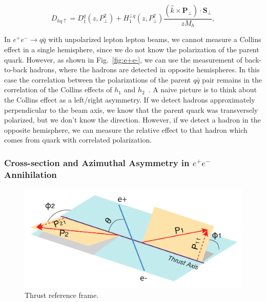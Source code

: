 \begin{equation}
D_{hq\uparrow}=D^q_1(z,P^2_{\bot})+H^{\bot q}_1(z,P^2_{\bot})\frac{(\hat{k}\times \boldsymbol{P}_{\bot})\cdot \boldsymbol{S}_{\perp}}{zM_h},
\label{eqn:FF1}
\end{equation}


In $e^+e^-\rightarrow q \bar q$  with unpolarized lepton lepton beams, we cannot measure a Collins effect in a single hemisphere, since we do not know the polarization of the parent quark. 
However, as shown in Fig.~\ref{fig:e+e-}, we can use the measurement of back-to-back hadrons, where the hadrons are detected in opposite hemispheres. In this case the correlation between the polarizations of the parent $q \bar q$ pair remains in the correlation of the Collins effects of $h_1$ and $h_2$~\cite{BoerThesis,ChargedPionResult2}. A naive picture is to think about the Collins effect as a left/right asymmetry. If we detect hadrons approximately perpendicular to the beam axis, we know that the parent quark was transversely polarized, but we don't know the direction. However, if we detect a hadron in the opposite hemisphere, we can measure the relative effect to that hadron which comes from quark with correlated polarization.

\subsubsection{Cross-section and Azimuthal Asymmetry in $e^+e^-$ Annihilation}

\begin{figure}[H]
  \centering     
  \includegraphics[width=.9\textwidth,natwidth=600,natheight=400]{figure_theory/e+e-_phi1phi2.pdf}
  \caption{Thrust reference frame.}
  \label{fig:phi1phi2frame}
\end{figure}


